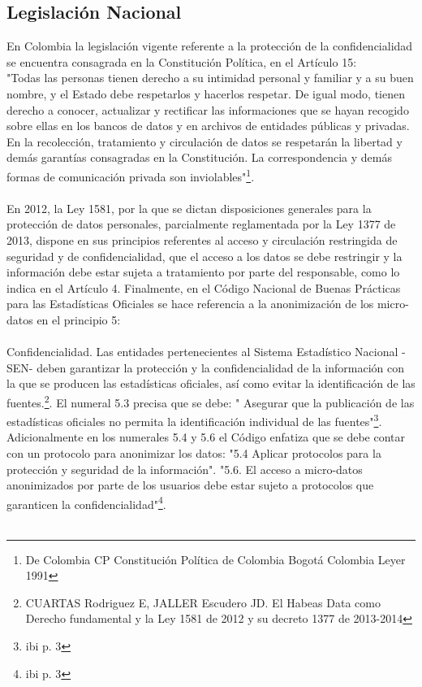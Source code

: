 \documentclass[a4paper,openright,12pt]{book}
\theoremstyle{definition}
\theoremstyle{remark}
\begin{document}
\subsection{Legislación Nacional}
En Colombia la legislación vigente referente a la protección de la confidencialidad se encuentra consagrada en la Constitución Política, en el Artículo 15:\\
"Todas las personas tienen derecho a su intimidad personal y familiar y a su buen nombre, y el Estado debe respetarlos y hacerlos respetar. De igual modo, tienen derecho a conocer, actualizar y rectificar las informaciones que se hayan recogido sobre ellas en los bancos de datos y en archivos de entidades públicas y privadas. En la recolección, tratamiento y circulación de datos se respetarán la libertad y demás garantías consagradas en la Constitución. La correspondencia y demás formas de comunicación privada son inviolables"\footnote{De Colombia CP Constitución Política de Colombia Bogotá Colombia Leyer 1991}.\\\\
En 2012, la Ley 1581, por la que se dictan disposiciones generales para la protección de datos personales, parcialmente reglamentada por la Ley 1377 de 2013, dispone en sus principios referentes al acceso y circulación restringida de seguridad y de confidencialidad, que el acceso a los datos se debe restringir y la información debe estar sujeta a tratamiento por parte del responsable, como lo indica en el Artículo 4. Finalmente, en el Código Nacional de Buenas Prácticas para las Estadísticas Oficiales se hace referencia a la anonimización de los micro-datos en el principio 5:\\\\
Confidencialidad. Las entidades pertenecientes al Sistema Estadístico Nacional -SEN- deben garantizar la protección y la confidencialidad de la información con la que se producen las estadísticas oficiales, así como evitar la identificación de las fuentes.\footnote{CUARTAS Rodriguez E, JALLER Escudero JD. El Habeas Data como Derecho fundamental y la Ley 1581 de 2012 y su decreto 1377 de 2013-2014}. El numeral 5.3  precisa que se debe:
" Asegurar que la publicación de las estadísticas oficiales no permita la identificación individual de las fuentes"\footnote{ibi p. 3}.
Adicionalmente en los numerales 5.4 y 5.6 el Código enfatiza que se debe contar con un protocolo para anonimizar los datos:
"5.4 Aplicar protocolos para la protección y seguridad de la información". "5.6. El acceso a micro-datos anonimizados por parte de los usuarios debe estar sujeto a protocolos que garanticen la confidencialidad"\footnote{ibi p. 3}.\\\\
\end{document}
